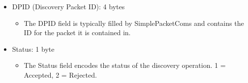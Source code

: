 \documentclass{article}
\begin{document}
\FloatBarrier

\begin{itemize}
    \item DPID (Discovery Packet ID): 4 bytes
    \begin{itemize}
        \item The DPID field is typically filled by SimplePacketComs and contains the ID for the
        packet it is contained in.
    \end{itemize}

    \item Status: 1 byte
    \begin{itemize}
        \item The Status field encodes the status of the discovery operation. 1 = Accepted, 2 =
        Rejected.
    \end{itemize}
\end{itemize}

\FloatBarrier
\end{document}
